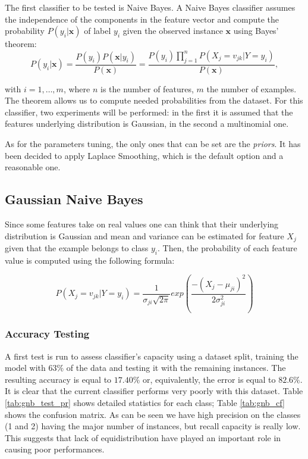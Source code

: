 \documentclass[a4paper, 10pt]{article}
\begin{document}
The first classifier to be tested is Naive Bayes. A Naive Bayes classifier assumes the independence of the components in the feature vector and compute the probability $P(y_i | \mathbf{x})$ of label $y_i$ given the observed instance $\mathbf{x}$ using Bayes' theorem:
\begin{equation}
 P(y_i | \mathbf{x}) = \dfrac{P(y_i)P(\mathbf{x} | y_i)}{P(\mathbf{x})}  = \dfrac{P(y_i)\prod_{j=1}^nP(X_j = v_{jk}|Y = y_i)}{P(\mathbf{x})},
\end{equation}

with $i = 1,\ldots, m$, where $n$ is the number of features, $m$ the number of examples. The theorem allows us to compute needed probabilities from the dataset. For this classifier, two experiments will be performed: in the first it is assumed that the features underlying distribution is Gaussian, in the second a multinomial one.

As for the parameters tuning, the only ones that can be set are the \emph{priors}. It has been decided to apply Laplace Smoothing, which is the default option and a reasonable one.

\subsection{Gaussian Naive Bayes}

Since some features take on real values one can think that their underlying distribution is Gaussian and mean and variance can be estimated for feature $X_j$ given that the example belongs to class $y_i$. Then, the probability of each feature value is computed using the following formula:

\begin{equation}
 P(X_j = v_{jk}|Y = y_i) = \dfrac{1}{\sigma_{ji}\sqrt{2\pi}}\textit{exp}\left(\dfrac{-(X_j - \mu_{ji})^2}{2\sigma^2_{ji}}\right)
\end{equation}

\subsubsection{Accuracy Testing}

A first test is run to assess classifier's capacity using a dataset split, training the model with $63\%$ of the data and testing it with the remaining instances. The resulting accuracy is equal to $17.40\%$ or, equivalently, the error is equal to $82.6\%$. It is clear that the current classifier performs very poorly with this dataset. Table \ref{tab:gnb_test_pr} shows detailed statistics for each class; Table \ref{tab:gnb_cf} shows the confusion matrix. As can be seen we have high precision on the classes (1 and 2) having the major number of instances, but recall capacity is really low. This suggests that lack of equidistribution have played an important role in causing poor performances.
\end{document}
